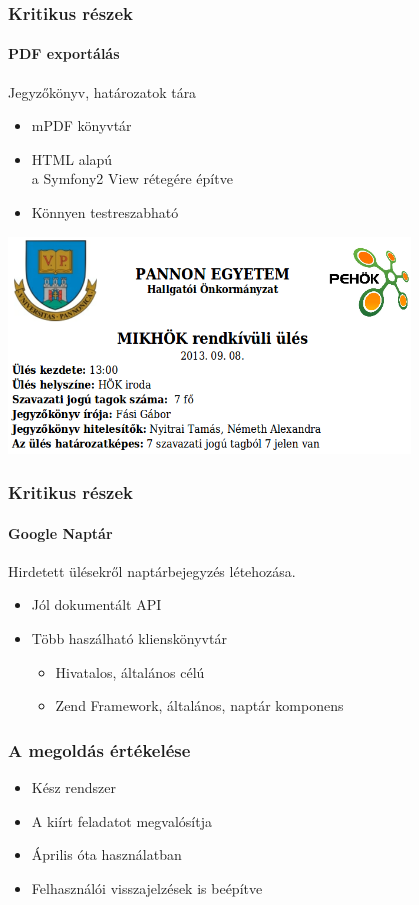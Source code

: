 \documentclass[12pt]{beamer}
\begin{document}
\begin{frame}
    \frametitle{Kritikus részek}
    \framesubtitle{PDF exportálás}
    
    \large
    Jegyzőkönyv, határozatok tára
    
    \begin{itemize}
        \item mPDF könyvtár
        \item HTML alapú\\
            \small a Symfony2 View rétegére építve
        \large
        \item Könnyen testreszabható
    \end{itemize}

    \begin{center}
        \includegraphics[center,width=0.8\textwidth,center]{jegyzokonyv-fejlec.png}
    \end{center}
\end{frame}

\begin{frame}
    \frametitle{Kritikus részek}
    \framesubtitle{Google Naptár}
    \large
    
    Hirdetett ülésekről naptárbejegyzés létehozása.
    
    \begin{itemize}
        \item Jól dokumentált API
        \item Több haszálható klienskönyvtár\\
        \begin{itemize}
        	\item Hivatalos, általános célú
        	\item Zend Framework, általános, naptár komponens
        \end{itemize}            
    \end{itemize}
\end{frame}

\begin{frame}
    \frametitle{A megoldás értékelése}
    
    \Large
    \begin{itemize}
        \item Kész rendszer
        \item A kiírt feladatot megvalósítja
        \item Április óta használatban
        \item Felhasználói visszajelzések is beépítve
    \end{itemize}
\end{frame}
\end{document}
